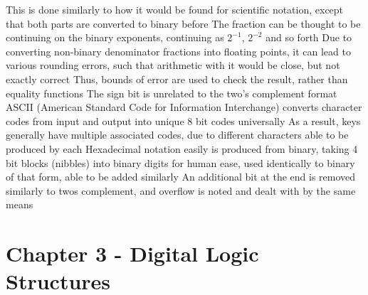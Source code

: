 \documentclass[11 pt, twoside]{article}
\newenvironment{outline*}
{
	\begin{outline}[enumerate]
	}
	{\end{outline}
}
\begin{document}
\begin{outline*}
\3 This is done similarly to how it would be found for scientific notation, except that both parts are converted to binary before
\3 The fraction can be thought to be continuing on the binary exponents, continuing as $2^{-1}$, $2^{-2}$ and so forth
\3 Due to converting non-binary denominator fractions into floating points, it can lead to various rounding errors, such that arithmetic with it would be close, but not exactly correct
\4 Thus, bounds of error are used to check the result, rather than equality functions
\2 The sign bit is unrelated to the two's complement format
\1 ASCII (American Standard Code for Information Interchange) converts character codes from input and output into unique 8 bit codes universally
\2 As a result, keys generally have multiple associated codes, due to different characters able to be produced by each
\1 Hexadecimal notation easily is produced from binary, taking 4 bit blocks (nibbles) into binary digits for human ease, used identically to binary of that form, able to be added similarly
\2 An additional bit at the end is removed similarly to twos complement, and overflow is noted and dealt with by the same means
\end{outline*}
\section{Chapter 3 - Digital Logic Structures}
\end{document}
